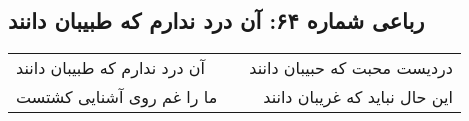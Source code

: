 \begin{center}
\section*{رباعی شماره ۶۴: آن درد ندارم که طبیبان دانند}
\label{sec:064}
\begin{longtable}{l p{0.5cm} r}
آن درد ندارم که طبیبان دانند
&&
دردیست محبت که حبیبان دانند
\\
ما را غم روی آشنایی کشتست
&&
این حال نباید که غریبان دانند
\\
\end{longtable}
\end{center}
